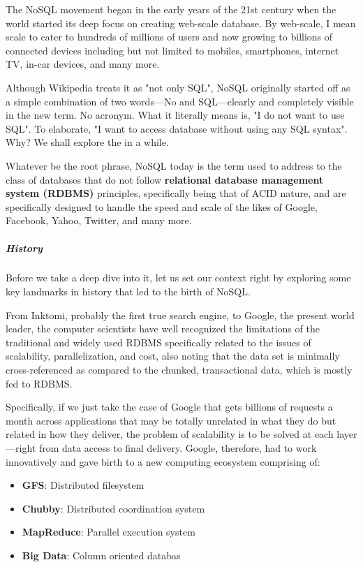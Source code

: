 The NoSQL movement began in the early years of the 21st century when the world
started its deep focus on creating web-scale database. By web-scale, I mean scale to
cater to hundreds of millions of users and now growing to billions of connected
devices including but not limited to mobiles, smartphones, internet TV, in-car
devices, and many more.

Although Wikipedia treats it as "not only SQL", NoSQL originally started off as a
simple combination of two words—No and SQL—clearly and completely visible in
the new term. No acronym. What it literally means is, "I do not want to use SQL".
To elaborate, "I want to access database without using any SQL syntax". Why? We
shall explore the in a while.

Whatever be the root phrase, NoSQL today is the term used to address to the class
of databases that do not follow \textbf{relational database management system (RDBMS)}
principles, specifically being that of ACID nature, and are specifically designed to
handle the speed and scale of the likes of Google, Facebook, Yahoo, Twitter, and
many more.

\subparagraph*{History}
\hfill \break
Before we take a deep dive into it, let us set our context right by exploring some key
landmarks in history that led to the birth of NoSQL.

From Inktomi, probably the first true search engine, to Google, the present
world leader, the computer scientists have well recognized the limitations of the
traditional and widely used RDBMS specifically related to the issues of scalability,
parallelization, and cost, also noting that the data set is minimally cross-referenced
as compared to the chunked, transactional data, which is mostly fed to RDBMS.

Specifically, if we just take the case of Google that gets billions of requests a month
across applications that may be totally unrelated in what they do but related in how
they deliver, the problem of scalability is to be solved at each layer—right from data
access to final delivery. Google, therefore, had to work innovatively and gave birth
to a new computing ecosystem comprising of:
\begin{itemize}
  \item \textbf{GFS}: Distributed filesystem
  \item \textbf{Chubby}: Distributed coordination system
  \item \textbf{MapReduce}: Parallel execution system
  \item \textbf{Big Data}: Column oriented databas
\end{itemize}
